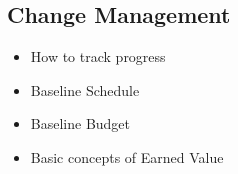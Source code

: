 \documentclass[8pt, letter]{extarticle}
\begin{document}
\begin{multicols}{2}
    \subsection{Change Management}
    \begin{itemize}
        \item How to track progress
        \item Baseline Schedule
        \item Baseline Budget
        \item Basic concepts of Earned Value
    \end{itemize}
\end{multicols}
\end{document}
